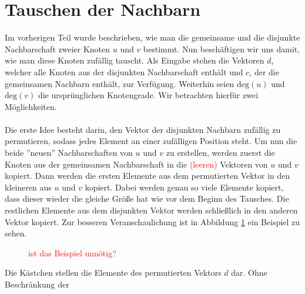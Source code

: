 \documentclass[a4paper]{scrreprt}
\theoremstyle{plain} %
\theoremstyle{definition} %
\begin{document}
\section{Tauschen der Nachbarn}
Im vorherigen Teil wurde beschrieben, wie man die gemeinsame und die disjunkte Nachbarschaft zweier Knoten
$u$ und $v$ bestimmt. Nun beschäftigen wir uns damit, wie man diese Knoten zufällig tauscht. Als Eingabe 
stehen die Vektoren $d$, welcher alle Knoten aus der disjunkten Nachbarschaft enthält
und $c$, der die gemeinsamen Nachbarn enthält, zur Verfügung. Weiterhin seien $\text{deg}(u)$ und
 $\text{deg}(v)$ die ursprünglichen Knotengrade. 
Wir betrachten hierfür zwei Möglichkeiten.
\\
\\
Die erste Idee besteht darin,  
den Vektor der disjunkten Nachbarn zufällig zu permutieren, sodass jedes Element an 
einer zufälligen Position steht. Um nun die beide ''neuen'' Nachbarschaften von $u$ und $v$ zu erstellen,
werden zuerst die Knoten aus der gemeinsamen Nachbarschaft in die \textcolor{red}{(leeren)} Vektoren von $u$ und $v$ kopiert.
Dann werden die ersten Elemente aus dem permutierten Vektor in den kleineren aus $u$ und $v$ kopiert.
Dabei werden genau so viele Elemente kopiert, dass dieser wieder die gleiche Größe hat wie vor dem Beginn
des Tausches. Die restlichen Elemente aus dem disjunkten Vektor werden schließlich in den anderen Vektor kopiert.
Zur besseren Veranschaulichung ist in Abbildung \ref{fig:trade_shuffle} ein Beispiel zu sehen.
\begin{figure}[h]
\centering
  \caption{\textcolor{red}{ist das Beispiel unnötig?}}
  \label{fig:trade_shuffle}
\end{figure}
Die Kästchen stellen die Elemente des permutierten Vektors $d$ dar. Ohne Beschränkung der
\end{document}
